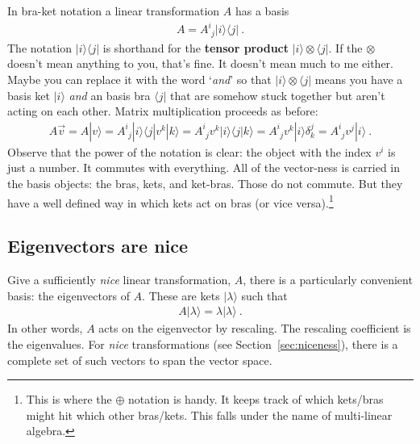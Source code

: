 In bra-ket notation a linear transformation $A$ has a basis
\begin{align}
  A = A^i_{\phantom{i}j} |i\rangle \langle j| \ .
\end{align}
The notation $|i\rangle \langle j|$ is shorthand for the \textbf{tensor product} $|i\rangle \otimes \langle j|$. If the $\otimes$ doesn’t mean anything to you, that’s fine. It doesn’t mean much to me either. Maybe you can replace it with the word `\emph{and}' so that $|i\rangle \otimes \langle j|$ means you have a basis ket $|i\rangle$ \emph{and} an basis bra $\langle j|$ that are somehow stuck together but aren't acting on each other. Matrix multiplication proceeds as before:
\begin{align}
  A\vec{v} = A|v\rangle = 
  A^i_{\phantom{i}j} |i\rangle \langle j| v^k |k \rangle
  = 
  A^i_{\phantom{i}j}  v^k  |i\rangle \langle j|k \rangle
  = 
  A^i_{\phantom{i}j}  v^k  |i\rangle \delta^j_k
  = 
  A^i_{\phantom{i}j}  v^j  |i\rangle \ .
\end{align}
Observe that the power of the notation is clear: the object with the index $v^i$ is just a number. It commutes with everything. All of the vector-ness is carried in the basis objects: the bras, kets, and ket-bras. Those do not commute. But they have a well defined way in which kets act on bras (or vice versa).\footnote{This is where the $\oplus$ notation is handy. It keeps track of which kets/bras might hit which other bras/kets. This falls under the name of multi-linear algebra.}


\subsection{Eigenvectors are nice}

Give a sufficiently \emph{nice} linear transformation, $A$, there is a particularly convenient basis: the eigenvectors of $A$. These are kets $|\lambda\rangle$ such that
\begin{align}
  A |\lambda\rangle = \lambda |\lambda\rangle \ .
\end{align}
In other words, $A$ acts on the eigenvector by rescaling. The rescaling coefficient is the eigenvalues. For \emph{nice} transformations (see Section~\ref{sec:niceness}), there is a complete set of such vectors to span the vector space.

